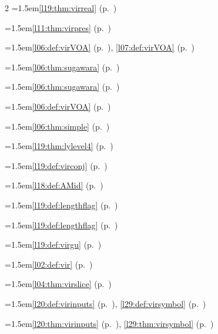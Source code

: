 \begin{multicols}{2}
\hangindent=1.5em\quad \ref{l19:thm:virreal} (p.~\pageref{l19:thm:virreal})\par
\hangindent=1.5em\quad \ref{l11:thm:virpres} (p.~\pageref{l11:thm:virpres})\par
\hangindent=1.5em\quad \ref{l06:def:virVOA} (p.~\pageref{l06:def:virVOA}), \ref{l07:def:virVOA} (p.~\pageref{l07:def:virVOA})\par
\hangindent=1.5em\quad \ref{l06:thm:sugawara} (p.~\pageref{l06:thm:sugawara})\par
\hangindent=1.5em\quad \ref{l06:thm:sugawara} (p.~\pageref{l06:thm:sugawara})\par
\hangindent=1.5em\quad \ref{l06:def:virVOA} (p.~\pageref{l06:def:virVOA})\par
\hangindent=1.5em\quad \ref{l06:thm:simple} (p.~\pageref{l06:thm:simple})\par
\hangindent=1.5em\quad \ref{l19:thm:lylevel4} (p.~\pageref{l19:thm:lylevel4})\par
\hangindent=1.5em\quad \ref{l19:def:virconj} (p.~\pageref{l19:def:virconj})\par
\hangindent=1.5em\quad \ref{l18:def:AMid} (p.~\pageref{l18:def:AMid})\par
\hangindent=1.5em\quad \ref{l19:def:lengthflag} (p.~\pageref{l19:def:lengthflag})\par
\hangindent=1.5em\quad \ref{l19:def:lengthflag} (p.~\pageref{l19:def:lengthflag})\par
\hangindent=1.5em\quad \ref{l19:def:virgu} (p.~\pageref{l19:def:virgu})\par
\hangindent=1.5em\quad \ref{l02:def:vir} (p.~\pageref{l02:def:vir})\par
\hangindent=1.5em\quad \ref{l04:thm:virslice} (p.~\pageref{l04:thm:virslice})\par
\hangindent=1.5em\quad \ref{l20:def:virinputs} (p.~\pageref{l20:def:virinputs}), \ref{l29:def:virsymbol} (p.~\pageref{l29:def:virsymbol})\par
\hangindent=1.5em\quad \ref{l20:thm:virinputs} (p.~\pageref{l20:thm:virinputs}), \ref{l29:thm:virsymbol} (p.~\pageref{l29:thm:virsymbol})\par

\end{multicols}

